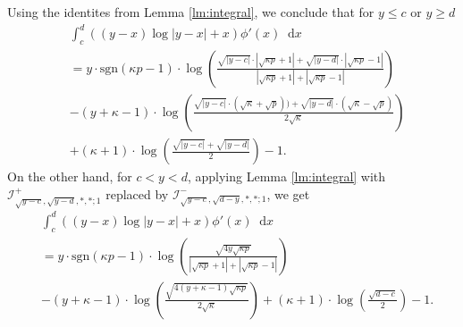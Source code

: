 \documentclass[reqno,11pt]{amsart}
\numberwithin{equation}{section}
\theoremstyle{definition}
\newcommand*\diff{\mathop{}\!\mathrm{d}}
\begin{document}
Using the identites from Lemma \ref{lm:integral}, we conclude that for $y\leq c$ or $y\geq d$
\begin{equation}\label{eq:logpotential_1}
    \begin{aligned}
        &\int_c^d \left((y-x)\log|y-x|+x\right)\phi'(x)\diff x \\
        &= y\cdot \mathrm{sgn}(\kappa p-1)\cdot\log \left(\frac{\sqrt{|y-c|}\cdot |\sqrt{\kappa p}+1|+\sqrt{|y-d|}\cdot |\sqrt{\kappa p}-1|}{|\sqrt{\kappa p}+1|+|\sqrt{\kappa p}-1|}\right)\\
        &- (y+\kappa-1)\cdot \log \left(\frac{\sqrt{|y-c|}\cdot (\sqrt{\kappa}+\sqrt{p}))+\sqrt{|y-d|}\cdot (\sqrt{\kappa}-\sqrt{p})}{2\sqrt{\kappa}}\right)\\
        &+(\kappa+1)\cdot \log\left(\frac{\sqrt{|y-c|}+\sqrt{|y-d|}}{2}\right)-1.
    \end{aligned}
\end{equation}
On the other hand, for $c<y<d$, applying Lemma \ref{lm:integral} with $\mathcal{I}^{+}_{\sqrt{y-c},{\sqrt{y-d}},*,*;1}$ replaced by $\mathcal{I}^{-}_{\sqrt{y-c},{\sqrt{d-y}},*,*;1}$, we get 
\begin{equation*}
    \begin{aligned}
        &\int_c^d \left((y-x)\log|y-x|+x\right)\phi'(x)\diff x \\
        &= y\cdot \mathrm{sgn}(\kappa p-1)\cdot\log \left(\frac{\sqrt{4y\sqrt{\kappa p}}}{|\sqrt{\kappa p}+1|+|\sqrt{\kappa p}-1|}\right)\\
        &- (y+\kappa-1)\cdot \log \left(\frac{\sqrt{4(y+\kappa-1)\sqrt{\kappa p}}}{2\sqrt{\kappa}}\right)+(\kappa+1)\cdot \log\left(\frac{\sqrt{d-c}}{2}\right)-1.
    \end{aligned}
\end{equation*}
\end{document}
